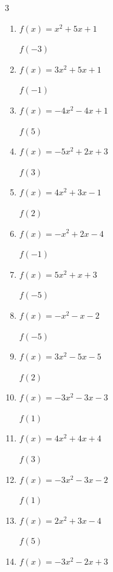 \begin{multicols}{3}
\begin{enumerate}
$f(1)$
        \phantom{$= 14$}

  \item $f(x)=x^{2}+5x+1$

$f(-3)$
        \phantom{$= -5$}

  \item $f(x)=3x^{2}+5x+1$

$f(-1)$
        \phantom{$= -1$}

  \item $f(x)=-4x^{2}-4x+1$

$f(5)$
        \phantom{$= -119$}

  \item $f(x)=-5x^{2}+2x+3$

$f(3)$
        \phantom{$= -36$}

  \item $f(x)=4x^{2}+3x-1$

$f(2)$
        \phantom{$= 21$}

  \item $f(x)=-x^{2}+2x-4$

$f(-1)$
        \phantom{$= -7$}

  \item $f(x)=5x^{2}+x+3$

$f(-5)$
        \phantom{$= 123$}

  \item $f(x)=-x^{2}-x-2$

$f(-5)$
        \phantom{$= -22$}

  \item $f(x)=3x^{2}-5x-5$

$f(2)$
        \phantom{$= -3$}

  \item $f(x)=-3x^{2}-3x-3$

$f(1)$
        \phantom{$= -9$}

\columnbreak %

\resetques

  \item $f(x)=4x^{2}+4x+4$

$f(3)$
        \phantom{$= 52$}

  \item $f(x)=-3x^{2}-3x-2$

$f(1)$
        \phantom{$= -8$}

  \item $f(x)=2x^{2}+3x-4$

$f(5)$
        \phantom{$= 61$}

  \item $f(x)=-3x^{2}-2x+3$


\end{enumerate}
\end{multicols}
